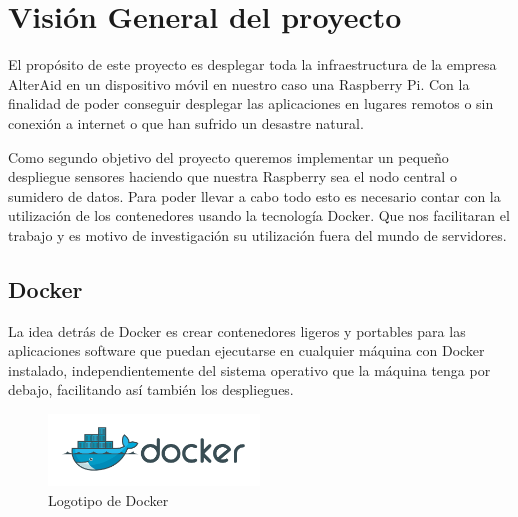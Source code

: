 \chapter{Visión General del proyecto}

El propósito de este proyecto es desplegar toda la infraestructura de la empresa AlterAid en un dispositivo móvil en nuestro caso una Raspberry Pi. Con la finalidad de poder conseguir desplegar las aplicaciones en lugares remotos o sin conexión a internet o que han sufrido un desastre natural.

Como segundo objetivo del proyecto queremos implementar un pequeño despliegue sensores haciendo que nuestra Raspberry sea el nodo central o sumidero de datos. 
Para poder llevar a cabo todo esto es necesario contar con la utilización de los contenedores usando la tecnología Docker. Que nos facilitaran el trabajo y es motivo de investigación su utilización fuera del mundo de servidores.

\section{Docker}

La idea detrás de Docker es crear contenedores ligeros y portables para las aplicaciones software que puedan ejecutarse en cualquier máquina con Docker instalado, independientemente del sistema operativo que la máquina tenga por debajo, facilitando así también los despliegues.

\begin{figure}[htb]
\begin{center}
\includegraphics[width=0.5\textwidth]{./setup/dockerLogo}
\caption{Logotipo de Docker}
\label{F:prova}
\end{center}
\end{figure}


